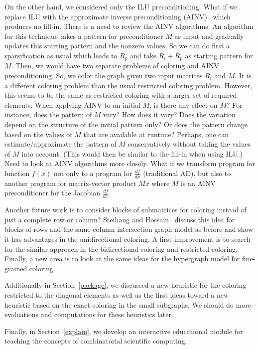 \documentclass[12pt, twoside,a4paper,toc=bibliography]{scrbook}
\newcommand{\secref}[1]{Section~\protect\ref{#1}}
\begin{document}
On the other hand, we considered only the ILU preconditioning. What if we replace ILU with the approximate inverse preconditioning (AINV)~\cite{ainv98} which produces no fill-in. There is a need to review the AINV algorithms. An algorithm for this technique takes a pattern for preconditioner $M$ as input and gradually updates this starting pattern and the nonzero values.
So we can do first a sparsification as usual which leads to $R_p$ and take $R_i + R_p$ as starting pattern for $M$. Then, we would have two separate problems of coloring and AINV preconditioning.
So, we color the graph given two input matrices $R_i$ and $M$.
It is a different coloring problem than the usual restricted coloring problem.
However, this seems to be the same as restricted coloring with a larger set of required elements.
When applying AINV to an initial $M$, is there any effect on $M$? For
instance, does the pattern of $M$ vary? How does it vary? Does the
variation depend on the structure of the initial pattern only? Or
does the pattern change based on the values of $M$ that are available
at runtime? Perhaps, one can estimate/approximate the pattern of $M$
conservatively without taking the values of $M$ into account. (This
would then be similar to the fill-in when using ILU.) Need to look
at AINV algorithms more closely.
What if we transform program for function $f(x)$ not only to a program for $\frac{df}{dx}$ (traditional AD),
but also to another program for matrix-vector product $Mx$ where $M$ is an AINV preconditioner for the Jacobian $\frac{df}{dx}$.

Another future work is to consider blocks of submatrices for coloring instead of just a complete row or column? Steihaug and Hossain~\cite{Steihaug1997GCa} discuss this idea for blocks of rows and the same column intersection graph model as before and show it has advantages in the unidirectional coloring. A first improvement is to search for the similar approach in the bidirectional coloring and restricted coloring. Finally, a new area is to look at the same ideas for the hypergraph model for fine-grained coloring.

Additionally in \secref{package}, we discussed a new heuristic for the coloring restricted to the diagonal elements
as well as the first ideas toward a new heuristic based on the exact coloring in the small subgraphs.
We should do more evaluations and computations for these heuristics later.

Finally, in \secref{explain}, we develop an interactive educational module 
for teaching the concepts of combinatorial scientific computing. 
\end{document}
